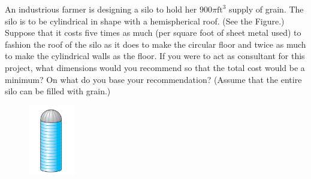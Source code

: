 \documentclass[11pt,letterpaper,boxed]{pset}
\begin{document}
    \newpage
    
    
    \begin{problem} [4.3.24]
    	An industrious farmer is designing a silo to hold her $900\pi \textrm{ft}^3$ supply of grain. The silo is to be cylindrical in shape with a hemispherical roof. (See the Figure.) Suppose that it costs five times as much (per square foot of sheet metal used) to fashion the roof of the silo as it does to make the circular floor and twice as much to make the cylindrical walls as the floor. If you were to act as consultant for this project, what dimensions would you recommend so that the total cost would be a minimum? On what do you base your recommendation? (Assume that the entire silo can be filled with grain.)
    
    \end{problem}
    
    \begin{figure}[h!]
        \begin{center}
            \includegraphics[width=20mm]{silo.png}
        \end{center}
    \end{figure}

    \newpage
    
\end{document}
